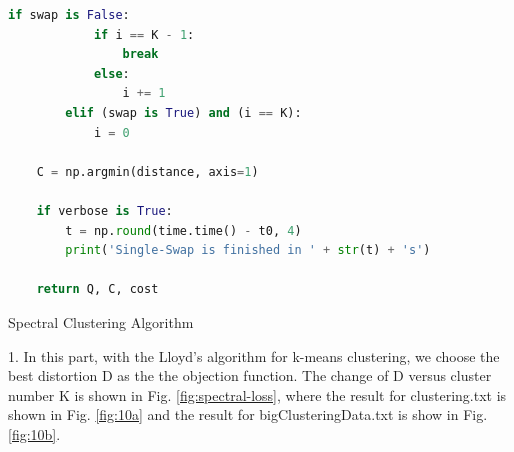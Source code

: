 \begin{description}
\begin{description}
\begin{lstlisting}[language=Python, caption=Single-Swap Algorithm Python Code]
        if swap is False:
            if i == K - 1:
                break
            else:
                i += 1
        elif (swap is True) and (i == K):
            i = 0

    C = np.argmin(distance, axis=1)

    if verbose is True:
        t = np.round(time.time() - t0, 4)
        print('Single-Swap is finished in ' + str(t) + 's')

    return Q, C, cost
\end{lstlisting}

\end{description}

\newpage
\item[\Romannum{4}.] Spectral Clustering Algorithm

\begin{description}
\item{1.} In this part, with the Lloyd's algorithm for k-means clustering, we choose the best distortion D as the the objection function. The change of D versus cluster number K is shown in Fig. \ref{fig:spectral-loss}, where the result for clustering.txt is shown in Fig. \ref{fig:10a} and the result for bigClusteringData.txt is show in Fig. \ref{fig:10b}.


\end{description}
\end{description}
